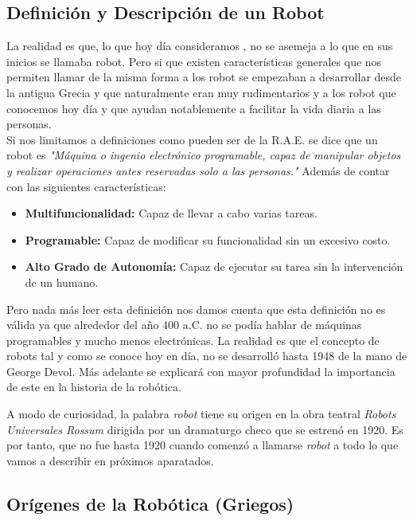 
\subsection{Definición y Descripción de un Robot}


La realidad es que, lo que hoy día consideramos , no se asemeja a lo que en sus inicios se llamaba robot. Pero si que existen características generales que nos permiten llamar de la misma forma a los robot se empezaban a desarrollar desde la antigua Grecia y que naturalmente eran muy rudimentarios y a los robot que conocemos hoy día y que ayudan notablemente a facilitar la vida diaria a las personas.\\

Si nos limitamos a definiciones como pueden ser de la R.A.E. se dice que un robot es \textit{"Máquina o ingenio electrónico programable, capaz de manipular objetos y realizar operaciones antes reservadas solo a las personas."} Además de contar con las siguientes características:

\begin{itemize}
\item \textbf{Multifuncionalidad:} Capaz de llevar a cabo varias tareas.
\item \textbf{Programable:} Capaz de modificar su funcionalidad sin un excesivo costo.
\item \textbf{Alto Grado de Autonomía:} Capaz de ejecutar su tarea sin la intervención de un humano.
\end{itemize}

Pero nada más leer esta definición nos damos cuenta que esta definición no es válida ya que alrededor del año 400 a.C. no se podía hablar de máquinas programables y mucho menos electrónicas. La realidad es que el concepto de robots tal y como se conoce hoy en día, no se desarrolló hasta 1948 de la mano de George Devol. Más adelante se explicará con mayor profundidad la importancia de este en la historia de la robótica.

A modo de curiosidad, la palabra \textit{robot} tiene su origen en la obra teatral \textit{Robots Universales Rossum} dirigida por un dramaturgo checo que se estrenó en 1920. Es por tanto, que no fue hasta 1920 cuando comenzó a llamarse \textit{robot} a todo lo que vamos a describir en próximos aparatados.

\subsection{Orígenes de la Robótica (Griegos)}

